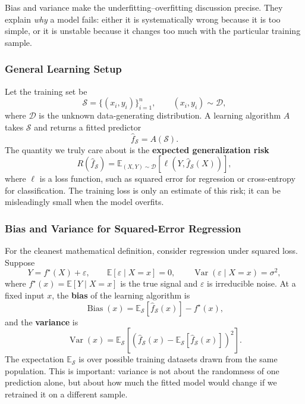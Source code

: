 \documentclass[12pt,openany]{book}
\begin{document}
Bias and variance make the underfitting--overfitting discussion precise. They explain \textit{why} a model fails: either it is systematically wrong because it is too simple, or it is unstable because it changes too much with the particular training sample.

\subsubsection{General Learning Setup}

Let the training set be
\begin{equation*}
    \mathcal{S} = \{(x_i,y_i)\}_{i=1}^{n}, \qquad (x_i,y_i) \sim \mathcal{D},
\end{equation*}
where \(\mathcal{D}\) is the unknown data-generating distribution. A learning algorithm \(A\) takes \(\mathcal{S}\) and returns a fitted predictor
\begin{equation*}
    \hat{f}_{\mathcal{S}} = A(\mathcal{S}).
\end{equation*}
The quantity we truly care about is the \textbf{expected generalization risk}
\begin{equation*}
    R(\hat{f}_{\mathcal{S}})
    = \mathbb{E}_{(X,Y) \sim \mathcal{D}}\!\left[\ell\left(Y,\hat{f}_{\mathcal{S}}(X)\right)\right],
\end{equation*}
where \(\ell\) is a loss function, such as squared error for regression or cross-entropy for classification. The training loss is only an estimate of this risk; it can be misleadingly small when the model overfits.

\subsubsection{Bias and Variance for Squared-Error Regression}

For the cleanest mathematical definition, consider regression under squared loss. Suppose
\begin{equation*}
    Y = f^{\star}(X) + \varepsilon,
    \qquad
    \mathbb{E}[\varepsilon \mid X=x] = 0,
    \qquad
    \operatorname{Var}(\varepsilon \mid X=x) = \sigma^{2},
\end{equation*}
where \(f^{\star}(x)=\mathbb{E}[Y\mid X=x]\) is the true signal and \(\varepsilon\) is irreducible noise. At a fixed input \(x\), the \textbf{bias} of the learning algorithm is
\begin{equation*}
    \operatorname{Bias}(x)
    = \mathbb{E}_{\mathcal{S}}\!\left[\hat{f}_{\mathcal{S}}(x)\right] - f^{\star}(x),
\end{equation*}
and the \textbf{variance} is
\begin{equation*}
    \operatorname{Var}(x)
    = \mathbb{E}_{\mathcal{S}}\!\left[
        \left(\hat{f}_{\mathcal{S}}(x)
        - \mathbb{E}_{\mathcal{S}}[\hat{f}_{\mathcal{S}}(x)]\right)^2
    \right].
\end{equation*}
The expectation \(\mathbb{E}_{\mathcal{S}}\) is over possible training datasets drawn from the same population. This is important: variance is not about the randomness of one prediction alone, but about how much the fitted model would change if we retrained it on a different sample.
\end{document}
